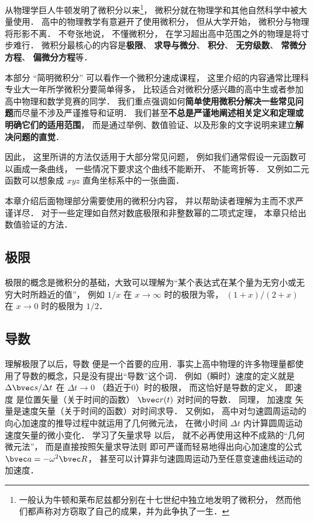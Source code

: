 

从物理学巨人牛顿发明了微积分以来\footnote{一般认为牛顿和莱布尼兹都分别在十七世纪中独立地发明了微积分， 然而他们都声称对方窃取了自己的成果，并为此争执了一生．}， 微积分就在物理学和其他自然科学中被大量使用． 高中的物理教学有意避开了使用微积分， 但从大学开始， 微积分与物理将形影不离． 不夸张地说， 不懂微积分， 在学习超出高中范围之外的物理是将寸步难行． 微积分最核心的内容是\textbf{极限}、 \textbf{求导与微分}、 \textbf{积分}、 \textbf{无穷级数}、 \textbf{常微分方程}、 \textbf{偏微分方程}等．

本部分 “简明微积分” 可以看作一个微积分速成课程， 这里介绍的内容通常比理科专业大一年所学微积分要简单得多， 比较适合对微积分感兴趣的高中生或者参加高中物理和数学竞赛的同学． 我们重点强调如何\textbf{简单使用微积分解决一些常见问题}而尽量不涉及严谨推导和证明． 我们甚至\textbf{不总是严谨地阐述相关定义和定理或明确它们的适用范围}， 而是通过举例、数值验证、以及形象的文字说明来建立\textbf{解决问题的直觉}．

因此， 这里所讲的方法仅适用于大部分常见问题， 例如我们通常假设一元函数可以画成一条曲线， 一些情况下要求这个曲线不能断开、 不能弯折等． 又例如二元函数可以想象成 $xyz$ 直角坐标系中的一张曲面．

本章介绍后面物理部分需要使用的微积分内容， 并以帮助读者理解为主而不求严谨详尽． 对于一些定理如自然对数底极限和非整数幂的二项式定理， 本章只给出数值验证的方法．

\subsection{极限}
极限的概念是微积分的基础，大致可以理解为“某个表达式在某个量为无穷小或无穷大时所趋近的值”， 例如 $1/x$ 在 $x\to\infty$ 时的极限为零， $(1+x)/(2+x)$ 在 $x\to 0$ 时的极限为 $1/2$． 

\subsection{导数}
理解极限了以后，导数 便是一个首要的应用．事实上高中物理的许多物理量都使用了导数的概念，只是没有提出“导数”这个词． 例如（瞬时）速度的定义就是 $\Delta\bvec s/\Delta t$ 在 $\Delta t \to 0$ （趋近于0）时的极限， 而这恰好是导数的定义， 即速度%
是位置矢量（关于时间的函数） $\bvec r(t)$ 对时间的导数． 同理， 加速度%
矢量是速度矢量（关于时间的函数）对时间求导． 又例如， 高中对匀速圆周运动的向心加速度的推导过程中就运用了几何微元法， 在微小时间 $\Delta t$ 内计算圆周运动速度矢量的微小变化． 学习了矢量求导 以后， 就不必再使用这种不成熟的“几何微元法”， 而是直接按照矢量求导法则 即可严谨而轻易地得出向心加速度的公式 $\bvec a = -\omega^2 \bvec R$， 甚至可以计算非匀速圆周运动乃至任意变速曲线运动的加速度．

